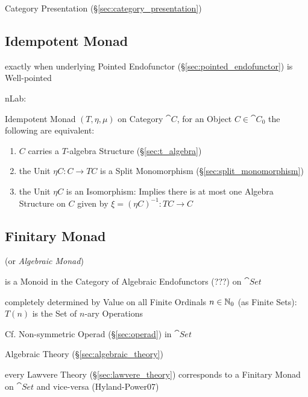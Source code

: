 Category Presentation (\S\ref{sec:category_presentation})



\subsection{Idempotent Monad}\label{sec:idempotent_monad}

exactly when underlying Pointed Endofunctor
(\S\ref{sec:pointed_endofunctor}) is Well-pointed

nLab:

Idempotent Monad $(T, \eta, \mu)$ on Category $\cat{C}$, for an Object
$C \in \cat{C}_0$ the following are equivalent:
\begin{enumerate}
  \item $C$ carries a $T$-algebra Structure (\S\ref{sec:t_algebra})
  \item the Unit $\eta C : C \rightarrow T C$ is a Split Monomorphism
    (\S\ref{sec:split_monomorphism})
  \item the Unit $\eta C$ is an Isomorphism: Implies there is at most
    one Algebra Structure on $C$ given by $\xi = (\eta C)^{-1} : T C
    \rightarrow C$ %
\end{enumerate}



\subsection{Finitary Monad}\label{sec:finitary_monad}

(or \emph{Algebraic Monad})

is a Monoid in the Category of Algebraic Endofunctors (???) on
$\cat{Set}$

completely determined by Value on all Finite Ordinals $n \in \mathbb{N}_0$
(as Finite Sets): $T(n)$ is the Set of $n$-ary Operations

\fist Cf. Non-symmetric Operad (\S\ref{sec:operad}) in
$\cat{Set}$


\asterism


Algebraic Theory (\S\ref{sec:algebraic_theory})

every Lawvere Theory (\S\ref{sec:lawvere_theory}) corresponds to a Finitary
Monad on $\cat{Set}$ and vice-versa (Hyland-Power07)

